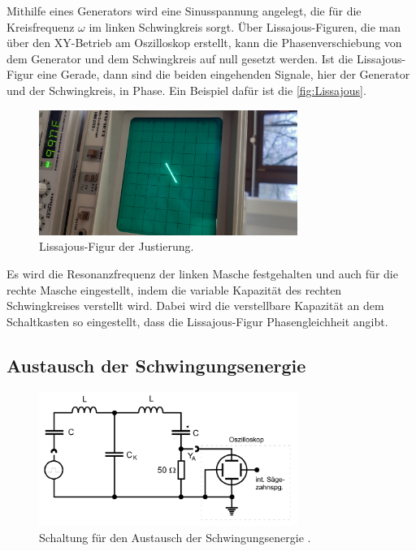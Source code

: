 \noindent Mithilfe eines Generators wird eine Sinusspannung angelegt, die  für die Kreisfrequenz $\omega$ im linken Schwingkreis sorgt. 
Über Lissajous-Figuren, die man über den XY-Betrieb am Oszilloskop erstellt, kann die Phasenverschiebung von dem Generator und 
dem Schwingkreis auf null gesetzt werden. Ist die Lissajous-Figur eine Gerade, dann sind die beiden eingehenden Signale, hier der
Generator und der Schwingkreis, in Phase. Ein Beispiel dafür ist die \autoref{fig:Lissajous}.
\begin{figure}[H]
    \centering
    \includegraphics[width=0.75\textwidth, angle=-90]{plots/Lissajour-Gerade.jpeg}
    \caption{Lissajous-Figur der Justierung.}
    \label{fig:Lissajous}
\end{figure}

\noindent Es wird die Resonanzfrequenz der linken Masche festgehalten und auch für die rechte Masche eingestellt, indem die variable Kapazität
des rechten Schwingkreises verstellt wird. Dabei wird die verstellbare Kapazität an dem Schaltkasten so eingestellt, dass die Lissajous-Figur Phasengleichheit 
angibt.

\subsection{Austausch der Schwingungsenergie}
\begin{figure}[H]
    \centering
    \includegraphics[width=0.75\textwidth]{plots/Schaltung1.png}
    \caption{Schaltung für den Austausch der Schwingungsenergie \cite{Versuchsanleitung}.}
    \label{fig:schaltung1}
\end{figure}

